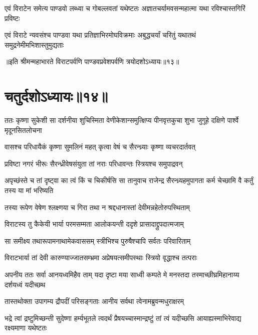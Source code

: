 
\fourlineindentedshloka
{एवं विराटेन समेत्य पाण्डवो}
{लब्ध्वा च गोबल्लवतां यथेष्टतः}
{अज्ञातचर्यामवसन्महात्मा}
{यथा रविश्चास्तगिरिं प्रविष्टः}


\fourlineindentedshloka
{एवं विराटे न्यवसंश्च पाण्डवा}
{यथा प्रतिज्ञाभिरमोघविक्रमाः}
{अबुद्धचर्यां चरितुं यथातथं}
{समुद्रनेमीमभिशास्तुमुद्यताः}

॥इति श्रीमन्महाभारते विराटपर्वणि पाण्डवप्रवेशपर्वणि त्रयोदशोऽध्यायः॥१३॥

\chapter{चतुर्दशोऽध्यायः॥१४॥ }

\threelineshloka
{ततः कृष्णा सुकेशी सा दर्शनीया शुचिस्मिता}
{वेणीकेशान्समुत्क्षिप्य पीनवृत्तकुचा शुभा}
{जुगूहे दक्षिणे पार्श्वे मृदूनसितलोचना}


\twolineshloka
{वासश्च परिधायैकं कृष्णा सुमलिनं महत्}
{कृत्वा वेषं च सैरन्ध्र्याः कृष्णा व्यचरदार्तवत्}


\twolineshloka
{प्रविष्टा नगरं भीरूः सैरन्ध्रीवेषसंयुता}
{तां नराः परिधावन्तः स्त्रियश्च समुपाद्रवन्}


\threelineshloka
{अपृच्छंस्ते च तां दृष्ट्वा का त्वं किं च चिकीर्षसि}
{सा तानुवाच राजेन्द्र सैरन्ध्र्यहमुपागता}
{कर्म चेच्छामि वै कर्तुं तस्य या मां भरिष्यति}



\twolineshloka
{तस्या रूपेण वेषेण श्लक्ष्णया च गिरा तथा}
{न श्रद्दधानास्तां देवीमन्नहेतोरुपस्थिताम्}


\twolineshloka
{विराटस्य तु कैकेयी भार्या परमसम्मता}
{आलोकयन्ती ददृशे प्रासादाद्द्रुपदात्मजाम्}


\twolineshloka
{सा समीक्ष्य तथारूपामनाथामेकवाससम्}
{स्त्रीभिश्च पुरुषैश्चापि सर्वतः परिवारिताम्}


\twolineshloka
{विराटभार्या तां देवी कारुण्याज्जातसम्भ्रमा}
{अप्रेषयत्समीपस्थाः स्त्रियो वृद्धाश्च तत्पराः}


\threelineshloka
{अपनीय ततः सर्वा आनयध्वमिहैव ताम्}
{यदा दृष्टा मया साध्वी कम्पते मे मनस्तदा}
{तस्माच्छीघ्रमिहानाय्य दर्शयध्वं यदीच्छथ}


\twolineshloka
{तास्तथोक्ता उपागम्य द्रौपदीं परिसङ्गताः}
{आनीय सर्वथा त्वेनामब्रुवन्मधुराक्षरम्}


\threelineshloka
{भद्रे त्वां द्रष्टुमिच्छन्ती सुदेष्णा हर्म्यभूतले}
{त्वदर्थं प्रैषयच्चास्मान्द्रष्टुं तां त्वं यदीच्छसि}
{आयाह्यस्माभिरेवाद्य रक्ष्यमाणा यथेष्टतः}


